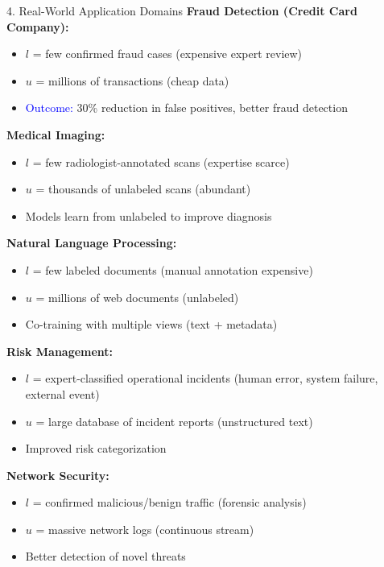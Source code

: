 \documentclass[8pt]{beamer}
\begin{document}
	\begin{frame}{4. Real-World Application Domains}
		\fontsize{6.5}{7.5}\selectfont
		\textbf{Fraud Detection (Credit Card Company):}
		\begin{itemize}
			\item $l$ = few confirmed fraud cases (expensive expert review)
			\item $u$ = millions of transactions (cheap data)
			\item \textcolor{blue}{Outcome:} 30\% reduction in false positives, better fraud detection
		\end{itemize}
		
		\textbf{Medical Imaging:}
		\begin{itemize}
			\item $l$ = few radiologist-annotated scans (expertise scarce)
			\item $u$ = thousands of unlabeled scans (abundant)
			\item Models learn from unlabeled to improve diagnosis
		\end{itemize}
		
		\textbf{Natural Language Processing:}
		\begin{itemize}
			\item $l$ = few labeled documents (manual annotation expensive)
			\item $u$ = millions of web documents (unlabeled)
			\item Co-training with multiple views (text + metadata)
		\end{itemize}
		
		\textbf{Risk Management:}
		\begin{itemize}
			\item $l$ = expert-classified operational incidents (human error, system failure, external event)
			\item $u$ = large database of incident reports (unstructured text)
			\item Improved risk categorization
		\end{itemize}
		
		\textbf{Network Security:}
		\begin{itemize}
			\item $l$ = confirmed malicious/benign traffic (forensic analysis)
			\item $u$ = massive network logs (continuous stream)
			\item Better detection of novel threats
		\end{itemize}
	\end{frame}
	
\end{document}
